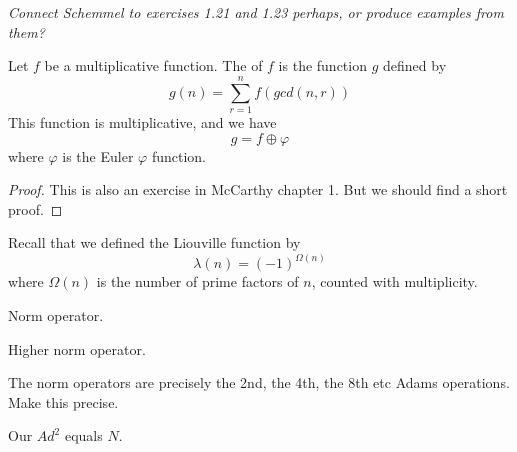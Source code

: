 \documentclass[a4paper]{article}
\begin{document}
\emph{Connect Schemmel to exercises 1.21 and 1.23 perhaps, or produce examples from them?}

\begin{propdef}
Let $f$ be a multiplicative function. The  of $f$ is the function $g$ defined by
$$ g(n) = \sum_{r=1}^n f(gcd(n, r))   $$
This function is multiplicative, and we have
$$ g = f \oplus \varphi    $$
where $\varphi$ is the Euler $\varphi$ function.
\end{propdef}
\begin{proof}
This is also an exercise in McCarthy chapter 1. But we should find a short proof.
\end{proof}


Recall that we defined the Liouville function by
$$  \lambda(n) = (-1)^{\Omega(n)} $$
where $\Omega(n)$ is the number of prime factors of $n$, counted with multiplicity. 
\begin{propdef}
Norm operator.
\end{propdef}


\begin{propdef}
Higher norm operator. 
\end{propdef}


\begin{theorem}
The norm operators are precisely the 2nd, the 4th, the 8th etc Adams operations. Make this precise.
\end{theorem}


\begin{theorem}
Our $Ad^2$ equals $N$.
\end{theorem}
\end{document}
